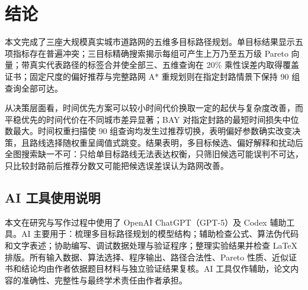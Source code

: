 \documentclass[UTF8,a4paper]{ctexart}
\begin{document}
\section{结论}

本文完成了三座大规模真实城市道路网的五维多目标路径规划。单目标结果显示五项指标存在普遍冲突；三目标精确搜索揭示每组可产生上万乃至五万级 Pareto 向量；带真实代表路径的标签合并使全部三、五维查询在 20\% 乘性误差内取得覆盖证书；固定尺度的偏好推荐与完整路网 A* 重规划则在指定封路情景下保持 90 组查询全部可达。

从决策层面看，时间优先方案可以较小时间代价换取一定的起伏与复杂度改善，而平稳优先的时间代价在不同城市差异显著；BAY 对指定封路的最短时间损失中位数最大。时间权重扫描使 90 组查询均发生过推荐切换，表明偏好参数确实改变决策，且路线选择随权重呈阈值式跳变。结果表明，多目标候选、偏好解释和扰动后全图搜索缺一不可：只给单目标路线无法表达权衡，只筛旧候选可能误判不可达，只比较封路前后推荐分数又可能把候选误差误认为路网改善。

\begin{mdframed}
\section*{AI 工具使用说明}

本文在研究与写作过程中使用了 OpenAI ChatGPT（GPT-5）及 Codex 辅助工具。AI 主要用于：梳理多目标路径规划的模型结构；辅助检查公式、算法伪代码和文字表述；协助编写、调试数据处理与验证程序；整理实验结果并检查 LaTeX 排版。所有输入数据、算法选择、程序输出、路径合法性、Pareto 性质、近似证书和结论均由作者依据题目材料与独立验证结果复核。AI 工具仅作辅助，论文内容的准确性、完整性与最终学术责任由作者承担。
\end{mdframed}
\end{document}
